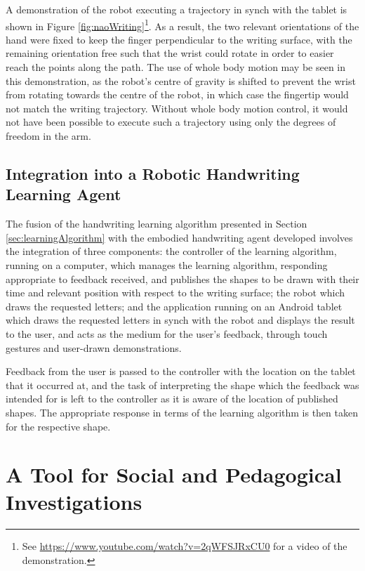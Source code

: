 \documentclass{sig-alternate}
\begin{document}
A demonstration of the robot executing a trajectory in synch with the tablet is
shown in Figure \ref{fig:naoWriting}\footnote{See
\url{https://www.youtube.com/watch?v=2qWFSJRxCU0} for a video of the
demonstration. }. As a result, the two relevant orientations of the hand were
fixed to keep the finger perpendicular to the writing surface, with the
remaining orientation free such that the wrist could rotate in order to easier
reach the points along the path. The use of whole body motion may be seen in
this demonstration, as the robot's centre of gravity is shifted to prevent the
wrist from rotating towards the centre of the robot, in which case the fingertip
would not match the writing trajectory. Without whole body motion control, it
would not have been possible to execute such a trajectory using only the degrees
of freedom in the arm.


\subsection{Integration into a Robotic Handwriting Learning Agent}

The fusion of the handwriting learning algorithm presented in Section
\ref{sec:learningAlgorithm} with the embodied handwriting agent developed
involves the integration of three components: the controller of the learning
algorithm, running on a computer, which manages the learning algorithm,
responding appropriate to feedback received, and publishes the shapes to be
drawn with their time and relevant position with respect to the writing surface;
the robot which draws the requested letters; and the application running on an
Android tablet which draws the requested letters in synch with the robot and
displays the result to the user, and acts as the medium for the user's feedback,
through touch gestures and user-drawn demonstrations.

Feedback from the user is passed to the controller with the location on the
tablet that it occurred at, and the task of interpreting the shape which the
feedback was intended for is left to the controller as it is aware of the
location of published shapes. The appropriate response in terms of the learning
algorithm is then taken for the respective shape. 



\section{A Tool for Social and Pedagogical Investigations} \label{sec:experiment}
\end{document}
